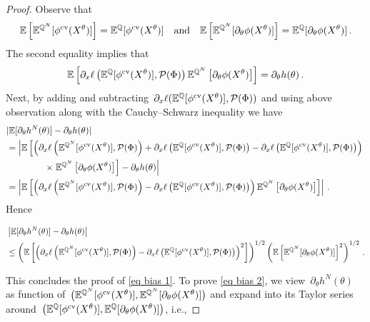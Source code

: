 \begin{proof}
Observe that
\[
\mathbb{E} \left[\mathbb{E}^{\mathbb{Q}^N}[\phi^{\textup{cv}}(X^{\theta})]\right] = \mathbb{E}^{\mathbb{Q}}[\phi^{\textup{cv}}(X^{\theta})] \quad \text{and} \quad \mathbb{E} \left[ \mathbb{E}^{\mathbb{Q}^N}[\partial_\theta \phi(X^{\theta})] \right] =\mathbb{E}^{\mathbb{Q}}[\partial_\theta \phi(X^{\theta})]\,.
\]  
The second equality implies that
\[
 \mathbb{E}\left[ \partial_x \ell\left(\mathbb{E}^{\mathbb{Q}}[\phi^{\textup{cv}}(X^{\theta})],\mathcal{P}(\Phi) \right) \mathbb{E}^{\mathbb{Q}^N}\left[\partial_\theta \phi(X^{\theta})\right] \right] =
  \partial_{\theta}h(\theta)\,.
\]
Next, by adding and subtracting~$\partial_x \ell(\mathbb{E}^{\mathbb{Q}}[\phi^{\textup{cv}}(X^{\theta})],\mathcal{P}(\Phi) )$ and using above observation along with the Cauchy--Schwarz inequality we have
\[
\begin{split}
& | \mathbb{E}[\partial_{\theta}h^{N}(\theta) ] - \partial_{\theta}h(\theta) |\\
	& =  \left| \mathbb{E}\left[\left(\partial_x \ell\left(\mathbb{E}^{\mathbb{Q}^N}[\phi^{\textup{cv}}(X^{\theta})],\mathcal{P}(\Phi) \right) + \partial_x \ell\left(\mathbb{E}^{\mathbb{Q}}[\phi^{\textup{cv}}(X^{\theta})],\mathcal{P}(\Phi) \right) -\partial_x \ell\left(\mathbb{E}^{\mathbb{Q}}[\phi^{\textup{cv}}(X^{\theta})],\mathcal{P}(\Phi) \right) \right) \right.\right. \\ & \qquad \qquad \left.\left. \times \; \mathbb{E}^{\mathbb{Q}^N}\left[\partial_\theta \phi(X^{\theta})\right]\right]
 - \partial_{\theta}h(\theta) \right|\, \\
& = \left|\mathbb{E}\left[\left(\partial_x \ell\left(\mathbb{E}^{\mathbb{Q}^N}[\phi^{\textup{cv}}(X^{\theta})],\mathcal{P}(\Phi) \right)- \partial_x \ell\left(\mathbb{E}^{\mathbb{Q}}[\phi^{\textup{cv}}(X^{\theta})],\mathcal{P}(\Phi) \right) \right)\mathbb{E}^{\mathbb{Q}^N}\left[\partial_\theta \phi(X^{\theta})\right] \right]  \right| \,.
 \end{split}
\]
Hence
\begin{small}
\begin{equation*}
\begin{split}
& \left\lvert \mathbb{E}[\partial_{\theta}h^{N}(\theta) ] - \partial_{\theta}h(\theta) \right\rvert\\
 & \leq \left( \mathbb{E}\left[ \left(\partial_x \ell\left(\mathbb{E}^{\mathbb{Q}^N}[\phi^{\textup{cv}}(X^{\theta})],\mathcal{P}(\Phi) \right)- \partial_x \ell\left(\mathbb{E}^{\mathbb{Q}}[\phi^{\textup{cv}}(X^{\theta})],\mathcal{P}(\Phi) \right) \right)^2 \right] \right)^{1/2} \left( \mathbb{E} \left[\mathbb{E}^{\mathbb{Q}^N}[\partial_\theta \phi(X^{\theta})]\right]^2 \right)^{1/2}\,.
 \end{split}
\end{equation*}
\end{small}
This concludes the proof of \eqref{eq bias 1}. To prove \eqref{eq bias 2}, we view~$\partial_{\theta}h^{N}(\theta)$ as function of~$\big(\mathbb{E}^{\mathbb{Q}^N}[\phi^{\textup{cv}}(X^{\theta})], \allowbreak \mathbb{E}^{\mathbb{Q}^N}[\partial_\theta \phi(X^{\theta})]\big)$ and expand into its Taylor series around~$\big(\mathbb{E}^{\mathbb{Q}}[\phi^{\textup{cv}}(X^{\theta})], \mathbb{E}^{\mathbb{Q}}[\partial_\theta \phi(X^{\theta})]\big)$, i.e.,

\end{proof}
